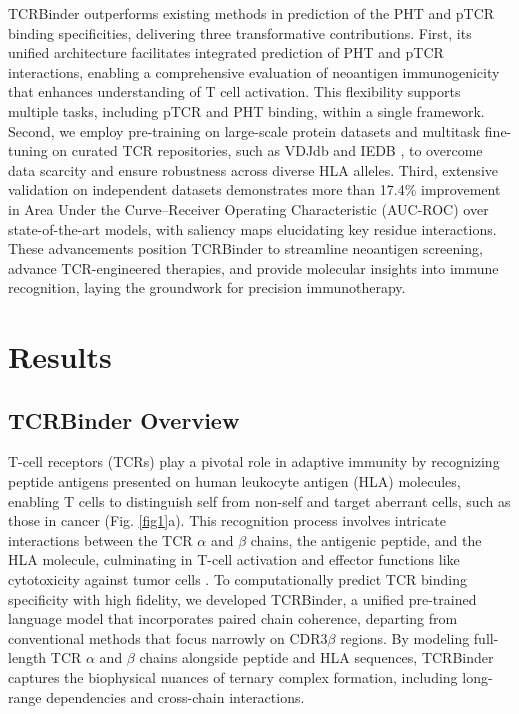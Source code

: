 \documentclass[10pt,letterpaper]{article}
\begin{document}
TCRBinder outperforms existing methods in prediction of the PHT and pTCR binding specificities, delivering three transformative contributions. First, its unified architecture facilitates integrated prediction of PHT and pTCR interactions, enabling a comprehensive evaluation of neoantigen immunogenicity that enhances understanding of T cell activation. This flexibility supports multiple tasks, including pTCR and PHT binding, within a single framework. Second, we employ pre-training on large-scale protein datasets and multitask fine-tuning on curated TCR repositories, such as VDJdb \cite{ref31} and IEDB \cite{ref32}, to overcome data scarcity and ensure robustness across diverse HLA alleles. Third, extensive validation on independent datasets demonstrates more than 17.4\% improvement in Area Under the Curve–Receiver Operating Characteristic (AUC-ROC) over state-of-the-art models, with saliency maps elucidating key residue interactions. These advancements position TCRBinder to streamline neoantigen screening, advance TCR-engineered therapies, and provide molecular insights into immune recognition, laying the groundwork for precision immunotherapy.


\section*{Results}
\subsection*{TCRBinder Overview}
T-cell receptors (TCRs) play a pivotal role in adaptive immunity by recognizing peptide antigens presented on human leukocyte antigen (HLA) molecules, enabling T cells to distinguish self from non-self and target aberrant cells, such as those in cancer (Fig. \ref{fig1}a). This recognition process involves intricate interactions between the TCR $\alpha$ and $\beta$ chains, the antigenic peptide, and the HLA molecule, culminating in T-cell activation and effector functions like cytotoxicity against tumor cells \cite{ref33,ref34,ref35}. To computationally predict TCR binding specificity with high fidelity, we developed TCRBinder, a unified pre-trained language model that incorporates paired chain coherence, departing from conventional methods that focus narrowly on CDR3$\beta$ regions. By modeling full-length TCR $\alpha$ and $\beta$ chains alongside peptide and HLA sequences, TCRBinder captures the biophysical nuances of ternary complex formation, including long-range dependencies and cross-chain interactions.
\end{document}
